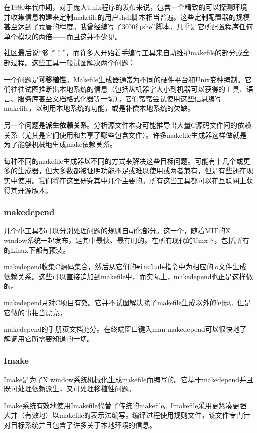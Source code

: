 \documentclass[12pt,oneside]{book}
\begin{document}
在1980年代中期，对于庞大Unix程序的发布来说，包含一个精致的可以探测环境并收集信息构建来定制makefile的用户shell脚本相当普遍。这些定制配置器的规模甚至达到了荒唐的程度。我曾经编写了3000行shell脚本，几乎是它所配置程序任何单个模块的两倍——而且这并不少见。

社区最后说“够了！”，而许多人开始着手编写工具来自动维护makefile的部分或全部过程。这些工具一般试图解决两个问题：

一个问题是\textbf{可移植性}。Makefile生成器通常为不同的硬件平台和Unix变种编制。它们往往试图推断出本地系统的信息（包括从机器字大小到机器可以获得的工具、语言、服务库甚至文档格式化器等一切）。它们常常尝试使用这些信息编写makefile，以利用本地系统的功能，或是补偿本地系统的欠缺。

另一个问题是\textbf{派生依赖关系}。分析源文件本身可能推导出大量C源码文件间的依赖关系（尤其是它们使用和共享了哪些包含文件）。许多makefile生成器这样做就是为了能够机械地生成make依赖关系。

每种不同的makefile生成器以不同的方式来解决这些目标问题。可能有十几个或更多的生成器，但大多数都被证明功能不足或难以使用或两者兼有，但是有些还在现实中使用。我们将在这里研究其中几个主要的。所有这些工具都可以在互联网上获得其开源版本。

\subsubsection{makedepend}
几个小工具都可以分别处理问题的规则自动化部分。这一个，随着MIT的X window系统一起发布，是其中最快、最有用的。在所有现代的Unix下，包括所有的Linux下都有预装。

makedepend收集C源码集合，然后从它们的\verb+#include+指令中为相应的.o文件生成依赖关系。这些可以直接追加到makefile中，而实际上，makedepend也正是这样做的。

makedepend只对C项目有效。它并不试图解决除了makefile生成以外的问题。但是它做的事相当漂亮。

makedepend的手册页文档充分。在终端窗口键入man makedepend可以很快地了解调用它所需要知道的一切。

\subsubsection{Imake}
Imake是为了X window系统机械化生成makefile而编写的。它基于makedepend并且既可处理依赖派生，又可处理移植性问题。

Imake系统有效地使用Imakefile代替了传统的makefile。Imakefile采用更紧凑更强大并（有效地）以makefile的表示法编写。编译过程使用规则文件，该文件专门针对目标系统并且包含了许多关于本地环境的信息。
\end{document}
